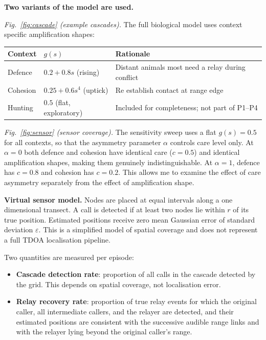 \documentclass[11pt,a4paper]{article}
\begin{document}
\textbf{Two variants of the model are used.}

\emph{Fig.~\ref{fig:cascade} (example cascades).} The full biological model uses
context specific amplification shapes:

\begin{center}\small
\begin{tabular}{lll}\toprule
Context  & $g(s)$                        & Rationale \\\midrule
Defence  & $0.2 + 0.8s$ (rising)         & Distant animals most need a relay during conflict\\
Cohesion & $0.25 + 0.6s^4$ (uptick)      & Re establish contact at range edge\\
Hunting  & $0.5$ (flat, exploratory)     & Included for completeness; not part of P1--P4\\
\bottomrule
\end{tabular}
\end{center}

\emph{Fig.~\ref{fig:sensor} (sensor coverage).} The sensitivity sweep uses a flat
$g(s)=0.5$ for all contexts, so that the asymmetry parameter $\alpha$ controls care
level only. At $\alpha=0$ both defence and cohesion have identical care ($c=0.5$)
and identical amplification shapes, making them genuinely indistinguishable. At
$\alpha=1$, defence has $c=0.8$ and cohesion has $c=0.2$.
This allows me to examine the effect of care asymmetry separately from the
effect of amplification shape.

\textbf{Virtual sensor model.} Nodes are placed at equal intervals along a one dimensional transect. A call is detected if at least two nodes lie within $r$ of its true
position. Estimated positions receive zero mean Gaussian error of standard
deviation $\varepsilon$. This is a simplified model of spatial coverage and does not represent a full
TDOA localisation pipeline.

Two quantities are measured per episode:
\begin{itemize}\setlength\itemsep{1pt}
  \item \textbf{Cascade detection rate}: proportion of all calls in the cascade
        detected by the grid. This depends on spatial coverage, not localisation error.
  \item \textbf{Relay recovery rate}: proportion of true relay events for which
        the original caller, all intermediate callers, and the relayer are detected,
        and their estimated positions are consistent with the successive audible range
        links and with the relayer lying beyond the original caller's range.
\end{itemize}
\end{document}
